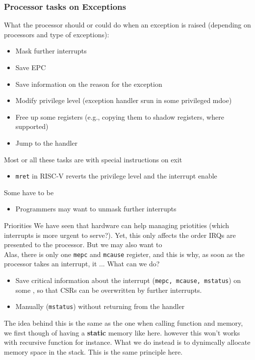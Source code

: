 \subsubsection{Processor tasks on Exceptions}
What the processor should or could do when an exception is raised (depending on processors and type of exceptions):
\begin{itemize}
    \item Mask further interrupts 
    \item Save EPC
    \item Save information on the reason for the exception
    \item Modify privilege level (exception handler srun in some privileged mdoe)
    \item Free up some registers (e.g., copying them to shadow registers, where supported)
    \item Jump to the handler
\end{itemize}
Most or all these tasks are  with special instructions on exit
\begin{itemize}[noitemsep]
	\item \texttt{mret} in RISC-V reverts the privilege level and the interrupt enable
\end{itemize}
Some have to be 
\begin{itemize}
    \item Programmers may want to unmask further interrupts 
\end{itemize}
\begin{parag}{Priorities}%
\label{par:Priorities}
We have seen that hardware  can help managing priotities (which interrupts is more urgent to serve?). Yet, this only affects the order IRQs are presented to the processor. But we may also want to \\
Alas, there is only one \texttt{mepc} and \texttt{mcause} register, and this is why, as soon as the processor takes an interrupt, it ... What can we do?\\
\begin{itemize}
    \item Save critical information about the interrupt (\texttt{mepc, mcause, mstatus}) on some , so that CSRs can be overwritten by further interrupts.
    \item Manually  (\texttt{mstatus}) without returning from the handler
\end{itemize}
\begin{framedremark}
The idea behind this is the same as the one when calling function and memory, we first though of having a \textbf{static} memory like here. however this won't works with recursive function for instance. What we do instead is to dynimcally allocate memory space in the stack. This is the same principle here.
\end{framedremark}
\end{parag}
